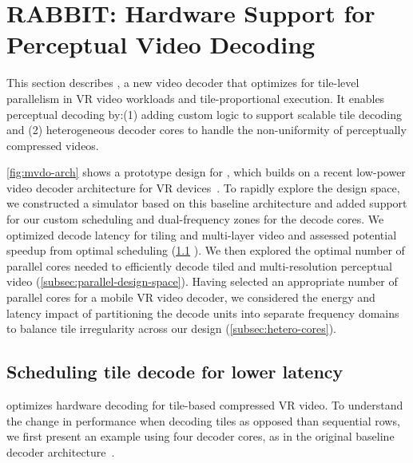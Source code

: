 \vfill\null

\section{RABBIT: Hardware Support for \\Perceptual Video Decoding}
\label{sec:vdo-hw}

This section describes \nameArch, a new video decoder that optimizes for tile-level parallelism in VR video workloads and tile-proportional execution.
It enables perceptual decoding by:(1) adding custom logic to support scalable tile decoding and (2) heterogeneous decoder cores to handle the non-uniformity of perceptually compressed videos.

\ref{fig:mvdo-arch} shows a prototype design for \nameArch, which builds on a recent low-power video decoder architecture for VR devices~\cite{tikekar18ijssc}.
To rapidly explore the design space, we constructed a simulator based on this baseline architecture and added support for our custom scheduling and dual-frequency zones for the decode cores.
We optimized decode latency for tiling and multi-layer video and assessed potential speedup from optimal scheduling (\ref{subsec:tile-sched} ).
We then explored the optimal number of parallel cores needed to efficiently decode tiled and multi-resolution perceptual video (\ref{subsec:parallel-design-space}).
Having selected an appropriate number of parallel cores for a mobile VR video decoder, we considered the energy and latency impact of partitioning the decode units into separate frequency domains to balance tile irregularity across our design (\ref{subsec:hetero-cores}).

\subsection{Scheduling tile decode for lower latency}
\label{subsec:tile-sched}
\nameArch optimizes hardware decoding for tile-based compressed VR video.
To understand the change in performance when decoding tiles as opposed than sequential rows, we first present an example using four decoder cores, as in the original baseline decoder architecture~\cite{hevcThesis}.


